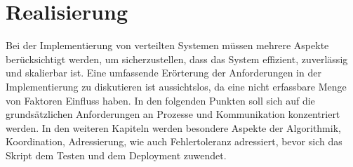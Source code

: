 \section{Realisierung}
Bei der Implementierung von verteilten Systemen müssen mehrere Aspekte berücksichtigt werden, um sicherzustellen, dass das System effizient, zuverlässig und skalierbar ist. Eine umfassende Erörterung der Anforderungen in der Implementierung zu diskutieren ist aussichtslos, da eine nicht erfassbare Menge von Faktoren Einfluss haben. In den folgenden Punkten soll sich auf die grundsätzlichen Anforderungen an Prozesse und Kommunikation konzentriert werden. In den weiteren Kapiteln werden besondere Aspekte der Algorithmik, Koordination, Adressierung, wie auch Fehlertoleranz adressiert, bevor sich das Skript dem Testen und  dem Deployment zuwendet. 

